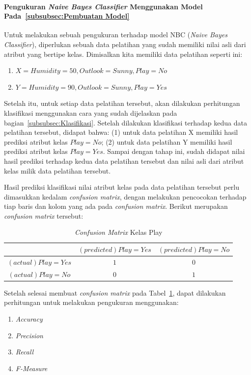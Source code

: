 \paragraph{Pengukuran \textit{Naive Bayes Classifier} Menggunakan Model Pada~\ref{subsubsec:Pembuatan Model}}

Untuk melakukan sebuah pengukuran terhadap model NBC (\textit{Naive Bayes Classifier}), diperlukan sebuah data pelatihan yang sudah memiliki nilai asli dari atribut yang bertipe kelas. Dimisalkan kita memiliki data pelatihan seperti ini:
\begin{enumerate}
	\item $X = {Humidity = 50, Outlook = Sunny, Play = No}$
	\item $Y = {Humidity = 90, Outlook = Sunny, Play = Yes}$
\end{enumerate}

Setelah itu, untuk setiap data pelatihan tersebut, akan dilakukan perhitungan klasifikasi menggunakan cara yang sudah dijelaskan pada bagian~\ref{subsubsec:Klasifikasi}. Setelah dilakukan klasifikasi terhadap kedua data pelatihan tersebut, didapat bahwa: (1) untuk data pelatihan X memiliki hasil prediksi atribut kelas $Play = No$; (2) untuk data pelatihan Y memiliki hasil prediksi atribut kelas $Play = Yes$. Sampai dengan tahap ini, sudah didapat nilai hasil prediksi terhadap kedua data pelatihan tersebut dan nilai asli dari atribut kelas milik data pelatihan tersebut. 

Hasil prediksi klasifikasi nilai atribut kelas pada data pelatihan tersebut perlu dimasukkan kedalam \textit{confusion matrix}, dengan melakukan pencocokan terhadap tiap baris dan kolom yang ada pada \textit{confusion matrix}. Berikut merupakan \textit{confusion matrix} tersebut:

\begin{table}[h]
\centering
\caption{\textit{Confusion Matrix} Kelas Play}
\label{tab:conf_matrix_kasus}
\begin{tabular}{ | c | c | c | }
\hline
 & $(predicted)Play=Yes$ & $(predicted)Play=No$ \\ \hline \hline
$(actual)Play=Yes$ & $1$ & $0$ \\ \hline
$(actual)Play=No$ & $0$ & $1$ \\ \hline
\end{tabular}
\end{table}

Setelah selesai membuat \textit{confusion matrix} pada Tabel~\ref{tab:conf_matrix_kasus}, dapat dilakukan perhitungan untuk melakukan pengukuran menggunakan:
\begin{enumerate}
	\item \textit{Accuracy}
	\item \textit{Precision}
	\item \textit{Recall}
	\item \textit{F-Measure}
\end{enumerate}

